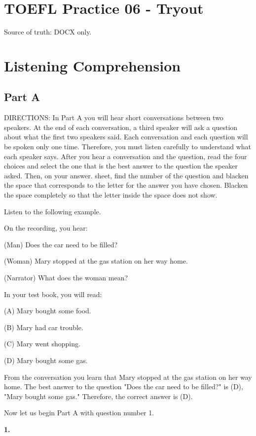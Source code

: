 \documentclass[12pt]{article}
\begin{document}
\section*{TOEFL Practice 06 - Tryout}
Source of truth: DOCX only.
\section*{Listening Comprehension}
\subsection*{Part A}
DIRECTIONS: In Part A you will hear short conversations between two speakers. At the end of each conversation, a third speaker will ask a question about what the first two speakers said. Each conversation and each question will be spoken only one time. Therefore, you must listen carefully to understand what each speaker says. After you hear a conversation and the question, read the four choices and select the one that is the best answer to the question the speaker asked. Then, on your answer. sheet, find the number of the question and blacken the space that corresponds to the letter for the answer you have chosen. Blacken the space completely so that the letter inside the space does not show.\par
\begin{exampleblock}
Listen to the following example.\par
On the recording, you hear:\par
(Man) Does the car need to be filled?\par
(Woman) Mary stopped at the gas station on her way home.\par
(Narrator) What does the woman mean?\par
In your test book, you will read:\par
(A) Mary bought some food.\par
(B) Mary had car trouble.\par
(C) Mary went shopping.\par
(D) Mary bought some gas.\par
From the conversation you learn that Mary stopped at the gas station on her way home. The best answer to the question "Does the car need to be filled?" is (D), "Mary bought some gas." Therefore, the correct answer is (D).\par
Now let us begin Part A with question number 1.\par
\end{exampleblock}
\noindent\textbf{1.}
\end{document}
